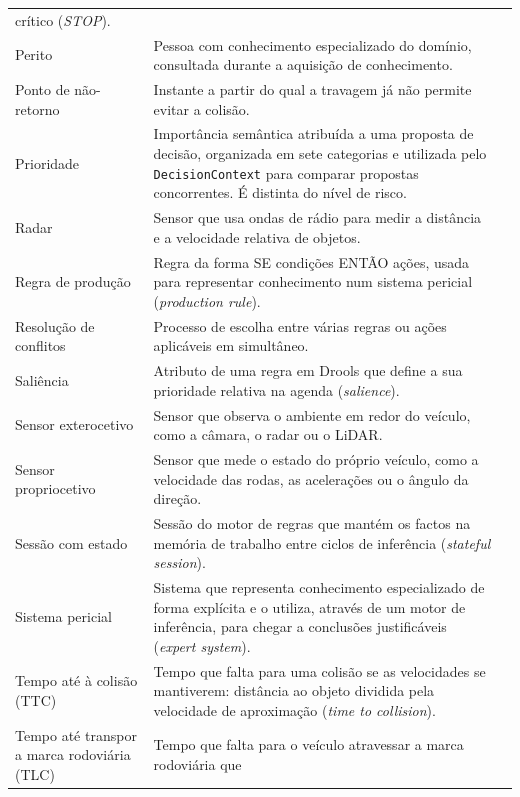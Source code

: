{\begin{longtable}{@{}L{4.4cm}VL{10.0cm}@{}}
      crítico (\emph{STOP}). \\ \linhasep
  Perito
    & Pessoa com conhecimento especializado do domínio, consultada durante
      a aquisição de conhecimento. \\ \linhasep
  Ponto de não-retorno
    & Instante a partir do qual a travagem já não permite evitar a
      colisão. \\ \linhasep
  Prioridade
    & Importância semântica atribuída a uma proposta de decisão, organizada
      em sete categorias e utilizada pelo \texttt{DecisionContext} para
      comparar propostas concorrentes. É distinta do nível de
      risco. \\ \linhasep
  Radar
    & Sensor que usa ondas de rádio para medir a distância e a velocidade
      relativa de objetos. \\ \linhasep
  Regra de produção
    & Regra da forma SE condições ENTÃO ações, usada para representar
      conhecimento num sistema pericial (\emph{production rule}). \\ \linhasep
  Resolução de conflitos
    & Processo de escolha entre várias regras ou ações aplicáveis em
      simultâneo. \\ \linhasep
  Saliência
    & Atributo de uma regra em Drools que define a sua prioridade relativa
      na agenda (\emph{salience}). \\ \linhasep
  Sensor exterocetivo
    & Sensor que observa o ambiente em redor do veículo, como a câmara, o
      radar ou o LiDAR. \\ \linhasep
  Sensor propriocetivo
    & Sensor que mede o estado do próprio veículo, como a velocidade das
      rodas, as acelerações ou o ângulo da direção. \\ \linhasep
  Sessão com estado
    & Sessão do motor de regras que mantém os factos na memória de
      trabalho entre ciclos de inferência (\emph{stateful session}). \\ \linhasep
  Sistema pericial
    & Sistema que representa conhecimento especializado de forma explícita
      e o utiliza, através de um motor de inferência, para chegar a
      conclusões justificáveis (\emph{expert system}). \\ \linhasep
  Tempo até à colisão (TTC)
    & Tempo que falta para uma colisão se as velocidades se mantiverem:
      distância ao objeto dividida pela velocidade de aproximação
      (\emph{time to collision}). \\ \linhasep
  Tempo até transpor a marca rodoviária (TLC)
    & Tempo que falta para o veículo atravessar a marca rodoviária que

\end{longtable}}

